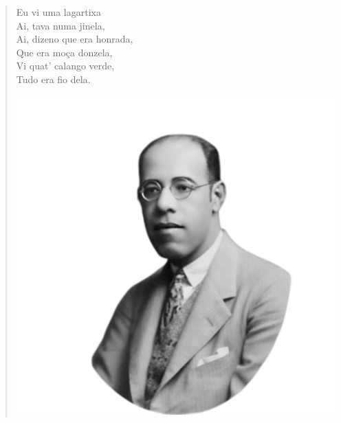 \begin{myquote}
\begin{verse}
\begin{minipage}{0.45\textwidth}
Eu vi uma lagartixa \\
Ai, tava numa jinela, \\
Ai, dizeno que era honrada, \\
Que era moça donzela, \\
Vi quat' calango verde, \\
Tudo era fio dela.
\end{minipage}
\hfill
\begin{minipage}{0.4\textwidth}
  \centering
  \includegraphics[width=\textwidth]{./imgSAEB_7_POR/media/image59.png}
\end{minipage} 
\end{verse}

\end{myquote}

